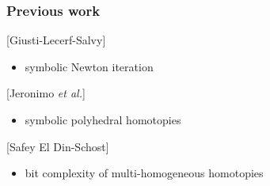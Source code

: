 \documentclass[mathserif,11pt]{beamer}
\def\db#1{\textcolor{_darkblue}{#1}}
\def\rf#1{\db{[{\sf \scriptsize #1}]}}
\begin{document}

\begin{frame}

\frametitle{Previous work}

\rf{Giusti-Lecerf-Salvy}
\begin{itemize}
\item symbolic Newton iteration
\end{itemize}

\medskip

\rf{Jeronimo {\it et al.}}
\begin{itemize}
\item symbolic polyhedral homotopies 
\end{itemize}

\medskip

\rf{Safey El Din-Schost}
\begin{itemize}
\item bit complexity of multi-homogeneous homotopies
\end{itemize}

\end{frame}

\end{document}

